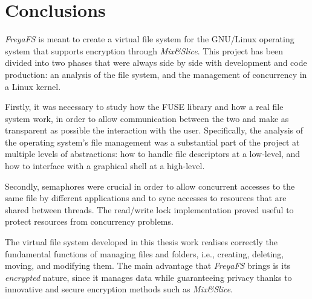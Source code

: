 \documentclass[a4paper,12pt,twoside,openright]{report}
\begin{document}

  \chapter{Conclusions}
  \thispagestyle{fancy}

  \textit{FreyaFS} is meant to create a virtual file system for the GNU/Linux
  operating system that supports encryption through \textit{Mix\&Slice}.
  This project has been divided into two phases that were always side by side with
  development and code production: an analysis of the file system, and the
  management of concurrency in a Linux kernel.

  Firstly, it was necessary to study how the FUSE library and how a real file system work,
  in order to allow communication between the two and make as transparent as possible
  the interaction with the user. Specifically, the analysis of the operating system's file management
  was a substantial part of the project at multiple levels of abstractions:
  how to handle file descriptors at a low-level, and how to interface with a graphical shell
  at a high-level.

  Secondly, semaphores were crucial in order to allow concurrent accesses to the same file
  by different applications and to sync accesses to resources that are shared between threads.
  The read/write lock implementation proved useful to protect resources from
  concurrency problems.

  The virtual file system developed in this thesis work realises correctly
  the fundamental functions of managing files and folders, i.e., creating,
  deleting, moving, and modifying them.
  The main advantage that \textit{FreyaFS} brings is its \textit{encrypted} nature,
  since it manages data while guaranteeing privacy thanks to innovative and secure
  encryption methods such as \textit{Mix\&Slice}.


  \nocite{*}
  \printbibliography[heading=bibintoc]
  \thispagestyle{fancy}
\end{document}
